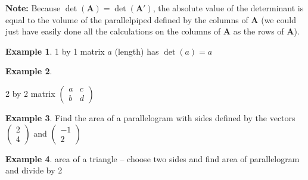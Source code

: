 \documentclass[
]{book}
\theoremstyle{definition}
\theoremstyle{definition}
\newtheorem{example}{Example}[chapter]
\theoremstyle{definition}
\theoremstyle{remark}
\begin{document}
\textbf{Note:} Because \(\det(\mathbf{A}) = \det(\mathbf{A}')\), the absolute value of the determinant is equal to the volume of the parallelpiped defined by the columns of \(\mathbf{A}\) (we could just have easily done all the calculations on the columns of \(\mathbf{A}\) as the rows of \(\mathbf{A}\)).

\begin{example}
\protect\hypertarget{exm:unnamed-chunk-219}{}{\label{exm:unnamed-chunk-219} }1 by 1 matrix \(a\) (length) has \(\det(a) = a\)
\end{example}

\begin{example}
\protect\hypertarget{exm:unlabeled-div-113}{}\label{exm:unlabeled-div-113}

2 by 2 matrix \(\begin{pmatrix} a & c \\ b & d \end{pmatrix}\)

\end{example}

\begin{example}
\protect\hypertarget{exm:unnamed-chunk-220}{}{\label{exm:unnamed-chunk-220} }Find the area of a parallelogram with sides defined by the vectors \(\begin{pmatrix} 2 \\ 4 \end{pmatrix}\) and \(\begin{pmatrix} -1 \\ 2 \end{pmatrix}\)
\end{example}

\begin{example}
\protect\hypertarget{exm:unnamed-chunk-221}{}{\label{exm:unnamed-chunk-221} }area of a triangle -- choose two sides and find area of parallelogram and divide by 2
\end{example}
\end{document}
